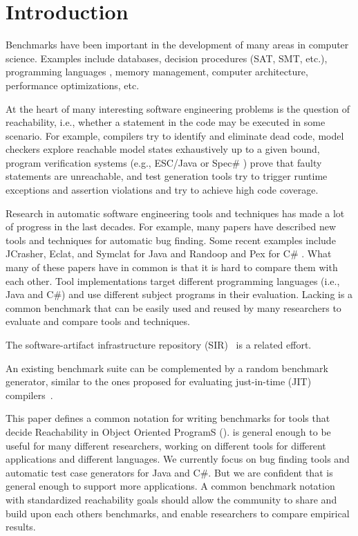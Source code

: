 \section{Introduction}

Benchmarks have been important in the development of many areas in computer science.
Examples include databases, decision procedures (SAT, SMT, etc.), 
programming languages \cite{blackburn06dacapo}, memory management, computer architecture,
performance optimizations, etc.

At the heart of many interesting software engineering problems is the question of
reachability, i.e., whether a statement in the code may be executed in some scenario.
For example, compilers try to identify and eliminate dead code,
model checkers explore reachable model states exhaustively up to a given bound,
program verification systems (e.g., ESC/Java or Spec\# \cite{flanagan02extended,barnett04spec}) prove that faulty statements are unreachable,
and test generation tools try to trigger runtime exceptions and assertion violations
and try to achieve high code coverage.

Research in automatic software engineering tools and techniques has made a lot 
of progress in the last decades. For example, many papers have described new tools
and techniques for automatic bug finding. 
Some recent examples include JCrasher, Eclat, and Symclat for Java 
\cite{csallner04jcrasher,pacheco05eclat,damorim06empirical}
and Randoop and Pex for C\# 
\cite{pacheco07feedback,tillmann08pex}. 
What many of these papers have in common is that it is 
hard to compare them with each other. Tool implementations
target different programming languages (i.e., Java and C\#) and use different
subject programs in their evaluation. 
Lacking is a common benchmark that
can be easily used and reused by many researchers to evaluate and compare tools and techniques.

The software-artifact infrastructure repository 
(SIR)~\cite{do05supporting} is a related effort.

An existing benchmark suite can be complemented by a random benchmark generator, similar to the ones proposed for evaluating
just-in-time (JIT) compilers~\cite{goldreich86how,yoshikawa03random}.

This paper defines a common notation for writing benchmarks for tools 
that decide Reachability in Object Oriented ProgramS ().
 is general enough to be useful for many different researchers,
working on different tools for different applications and different languages.
We currently focus on bug finding tools and automatic test case generators
for Java and C\#. But we are confident that  is general enough to 
support more applications.
A common benchmark notation with standardized reachability goals should allow 
the community to share and build upon each others benchmarks, and enable
researchers to compare empirical results.

